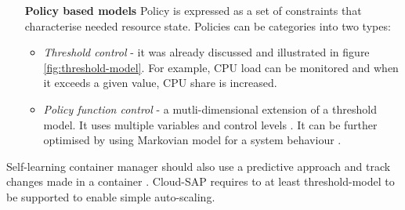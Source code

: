 \begin{itemize}
 \item[\textbf{Policy based models}] Policy is expressed as a set of constraints that characterise needed resource state. Policies can be categories into two types:
    \begin{itemize}
     \item \emph{Threshold control} - it was already discussed and illustrated in figure \ref{fig:threshold-model}. For example, CPU load can be monitored and when it exceeds a given value, CPU share is increased.
     \item \emph{Policy function control} - a mutli-dimensional extension of a threshold model. It uses multiple variables and control levels \cite{abdeen2002seeking}. It can be further optimised by using Markovian model for a system behaviour \cite{ye2000markov}.     
    \end{itemize}

\end{itemize}
Self-learning container manager should also use a predictive approach \cite{JiPeLiCh11} and track changes made in a container \cite{ZhYaWo05}. Cloud-SAP requires to at least threshold-model \cite{tong1978threshold} to be supported to enable simple auto-scaling.

